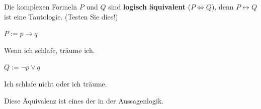 %
%
%
%
%
%
%
%


\begin{frame}

Die komplexen Formeln $P$ und $Q$ sind \textbf{logisch äquivalent} ($P \Leftrightarrow Q$), denn $P \leftrightarrow Q$ ist eine Tautologie. (Testen Sie dies!)

\begin{exe}
	
	 $P := p \rightarrow q$
	
	Wenn ich schlafe, träume ich.
	
	 $Q := \lnot p \lor q$
	
	Ich schlafe nicht oder ich träume.
		
\end{exe}

Diese Äquivalenz ist eines der  in der Aussagenlogik.

\end{frame}


